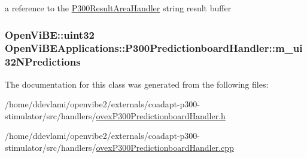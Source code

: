 \label{classOpenViBEApplications_1_1P300PredictionboardHandler_a5015ad9ca746eceab8e8184927733870}
a reference to the \hyperlink{classOpenViBEApplications_1_1P300ResultAreaHandler}{P300ResultAreaHandler} string result buffer \hypertarget{classOpenViBEApplications_1_1P300PredictionboardHandler_a19cd1ecf79bbb6282a24fa2e9034f802}{
\subsubsection[{m\_\-ui32NPredictions}]{\setlength{\rightskip}{0pt plus 5cm}OpenViBE::uint32 {\bf OpenViBEApplications::P300PredictionboardHandler::m\_\-ui32NPredictions}}}
\label{classOpenViBEApplications_1_1P300PredictionboardHandler_a19cd1ecf79bbb6282a24fa2e9034f802}


The documentation for this class was generated from the following files:\begin{DoxyCompactItemize}
\item 
/home/ddevlami/openvibe2/externals/coadapt-\/p300-\/stimulator/src/handlers/\hyperlink{ovexP300PredictionboardHandler_8h}{ovexP300PredictionboardHandler.h}\item 
/home/ddevlami/openvibe2/externals/coadapt-\/p300-\/stimulator/src/handlers/\hyperlink{ovexP300PredictionboardHandler_8cpp}{ovexP300PredictionboardHandler.cpp}\end{DoxyCompactItemize}
